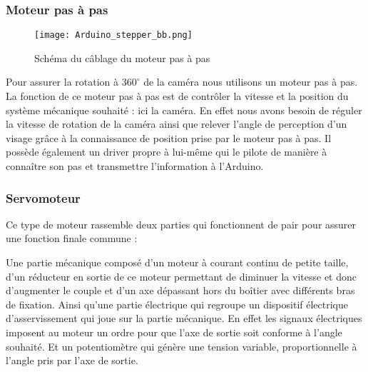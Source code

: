 \documentclass[12pt,a4paper]{article}
\begin{document}
\subsubsection{Moteur pas à pas}

\begin{figure}[ht!]
		\centering
			\texttt{[image: Arduino\_stepper\_bb.png]}
			\caption[Schéma du câblage du moteur pas à pas - Illustration réalisée par notre groupe, disponible à l'adresse : \url{https://github.com/thaspdev/PATRICK/blob/master/circuits/Arduino_stepper/Arduino_stepper_bb.png}, ainsi qu'à cette adresse au format Fritzing : \url{https://github.com/thaspdev/PATRICK/blob/master/circuits/Arduino_stepper/Arduino_stepper.fzz}]{Schéma du câblage du moteur pas à pas\label{overflow}}
	\end{figure}

Pour assurer la rotation à $360 ^\circ$ de la caméra nous utilisons un moteur pas à pas. La fonction de ce moteur pas à pas est de contrôler la vitesse et la position du système mécanique souhaité : ici la caméra. En effet nous avons besoin de réguler la vitesse de rotation de la caméra ainsi que relever l’angle de perception d’un visage grâce à la connaissance de position prise par le moteur pas à pas. Il possède également un driver propre à lui-même qui le pilote de manière à connaître son pas et transmettre l’information à l’Arduino.

\subsubsection{Servomoteur}

Ce type de moteur rassemble deux parties qui fonctionnent de pair pour assurer une fonction finale commune :

Une partie mécanique composé d’un moteur à courant continu de petite taille, d’un réducteur en sortie de ce moteur permettant de diminuer la vitesse et donc d’augmenter le couple et d’un axe dépassant hors du boîtier avec différents bras de fixation. 
Ainsi qu’une partie électrique qui regroupe un dispositif électrique d’asservissement qui joue sur la partie mécanique. En effet les signaux électriques imposent au moteur un ordre pour que l’axe de sortie soit conforme à l’angle souhaité. Et un potentiomètre qui génère une tension variable, proportionnelle à l’angle pris par l’axe de sortie.
\end{document}
